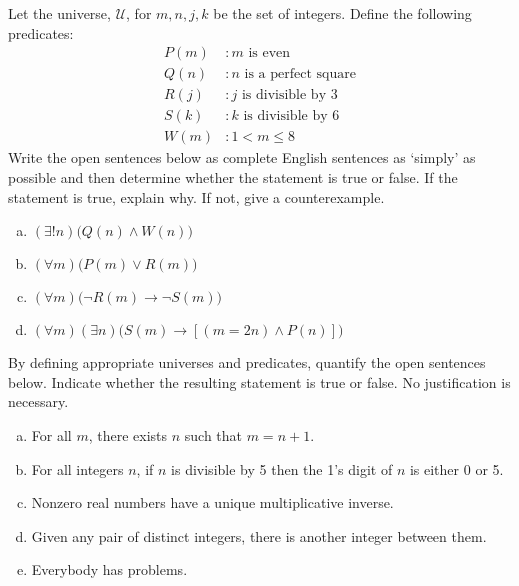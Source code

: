\documentclass[11pt,letterpaper]{article}
\begin{document}

 Let the universe, $\mathcal{U}$, for $m, n, j, k$ be the set of integers. Define the following predicates:
	\[
	\begin{aligned}
	P(m) &\colon m \text{ is even} \\
	Q(n) &\colon n \text{ is a perfect square} \\
	R(j) &\colon j \text{ is divisible by 3} \\
	S(k) &\colon k \text{ is divisible by 6} \\
	W(m) &\colon 1 < m \leq 8
	\end{aligned}
	\]
Write the open sentences below as complete English sentences as `simply' as possible and then determine whether the statement is true or false. If the statement is true, explain why. If not, give a counterexample. 
	\begin{enumerate}[(a)]
	\item $(\exists! n) \big( Q(n) \wedge W(n) \big)$ 
	\item $(\forall m) \big( P(m) \vee R(m) \big)$ 
	\item $(\forall m) \big( \neg R(m) \to \neg S(m) \big)$ 
	\item $(\forall m) (\exists n) \big( S(m) \to [(m= 2n) \wedge P(n)] \big)$ 
	\end{enumerate} 



\newpage



 By defining appropriate universes and predicates, quantify the open sentences below. Indicate whether the resulting statement is true or false. No justification is necessary. 
	\begin{enumerate}[(a)]
	\item For all $m$, there exists $n$ such that $m= n + 1$.
	\item For all integers $n$, if $n$ is divisible by 5 then the 1's digit of $n$ is either 0 or 5.
	\item Nonzero real numbers have a unique multiplicative inverse. 
	\item Given any pair of distinct integers, there is another integer between them.
	\item Everybody has problems. 
	\end{enumerate}
\end{document}
